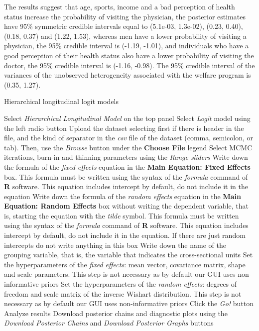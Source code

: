 The results suggest that age, sports, income and a bad perception of health status increase the probability of visiting the physician, the posterior estimates have 95\% symmetric credible intervals equal to (5.1e-03, 1.3e-02), (0.23, 0.40), (0.18, 0.37) and (1.22, 1.53), whereas men have a lower probability of visiting a physician, the 95\% credible interval is (-1.19, -1.01), and individuals who have a good perception of their health status also have a lower probability of visiting the doctor, the 95\% credible interval is (-1.16, -0.98). The 95\% credible interval of the variances of the unobserved heterogeneity associated with the welfare program is (0.35, 1.27).\\

\begin{algorithm}[h!]
	\caption{Hierarchical longitudinal logit models}\label{alg:HLogit}
	\begin{algorithmic}[1]  		 			
		\State Select \textit{Hierarchical Longitudinal Model} on the top panel
		\State Select \textit{Logit} model using the left radio button
		\State Upload the dataset selecting first if there is header in the file, and the kind of separator in the \textit{csv} file of the dataset (comma, semicolon, or tab). Then, use the \textit{Browse} button under the \textbf{Choose File} legend
		\State Select MCMC iterations, burn-in and thinning parameters using the \textit{Range sliders}
		\State Write down the formula of the \textit{fixed effects} equation in the \textbf{Main Equation: Fixed Effects} box. This formula must be written using the syntax of the \textit{formula} command of \textbf{R} software. This equation includes intercept by default, do not include it in the equation
		\State Write down the formula of the \textit{random effects} equation in the \textbf{Main Equation: Random Effects} box without writing the dependent variable, that is, starting the equation with the \textit{tilde} symbol. This formula must be written using the syntax of the \textit{formula} command of \textbf{R} software. This equation includes intercept by default, do not include it in the equation. If there are just random intercepts do not write anything in this box
		\State Write down the name of the grouping variable, that is, the variable that indicates the cross-sectional units 
		\State Set the hyperparameters of the \textit{fixed effects}: mean vector, covariance matrix, shape and scale parameters. This step is not necessary as by default our GUI uses non-informative priors
		\State Set the hyperparameters of the \textit{random effects}: degrees of freedom and scale matrix of the inverse Wishart distribution. This step is not necessary as by default our GUI uses non-informative priors
		\State Click the \textit{Go!} button
		\State Analyze results
		\State Download posterior chains and diagnostic plots using the \textit{Download Posterior Chains} and \textit{Download Posterior Graphs} buttons
	\end{algorithmic} 
\end{algorithm}

